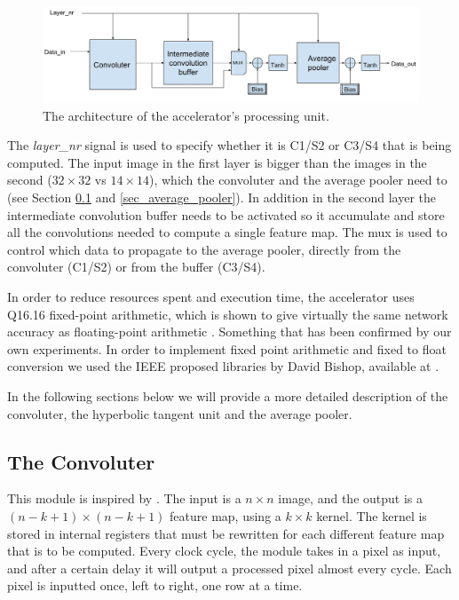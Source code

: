 \begin{figure}[h!]
	\centering
    	\includegraphics[width=1.0\textwidth]{Figures/Method/conv_layer_arch}
  	\caption[Accelerator's processing unit]{The architecture of the accelerator's processing unit.}
  	\label{fig_imagezor_architecture}
\end{figure}

The \textit{layer\_nr} signal is used to specify whether it is C1/S2 or C3/S4 that is being computed. The input image in the first layer is bigger than the images in the second ($ 32 \times 32 $ vs $ 14 \times 14 $), which the convoluter and the average pooler need to  (see Section \ref{sec_convoluter} and \ref{sec_average_pooler}). In addition in the second layer the intermediate convolution buffer needs to be activated so it accumulate and store all the convolutions needed to compute a single feature map. The mux is used to control which data to propagate to the average pooler, directly from the convoluter (C1/S2) or from the buffer (C3/S4). 

In order to reduce resources spent and execution time, the accelerator uses Q16.16 fixed-point arithmetic, which is shown to give virtually the same network accuracy as floating-point arithmetic\cite{Napocensis2009} \cite{Holt1993} \cite{Chen2014}. Something that has been confirmed by our own experiments. In order to implement fixed point arithmetic and fixed to float conversion we used the IEEE proposed libraries by David Bishop, available at \cite{Bishop2015}.   

In the following sections below we will provide a more detailed description of the convoluter, the hyperbolic tangent unit and the average pooler. 


\subsection{The Convoluter} \label{sec_convoluter}

This module is inspired by \cite{Farabet2009}. The input is a $ n \times n $ image, and the output is a $ (n-k+1) \times (n-k+1) $ feature map, using a $ k \times k $ kernel. The kernel is stored in internal registers that must be rewritten for each different feature map that is to be computed. Every clock cycle, the module takes in a pixel as input, and after a certain delay it will output a processed pixel almost every cycle. Each pixel is inputted once, left to right, one row at a time. 

